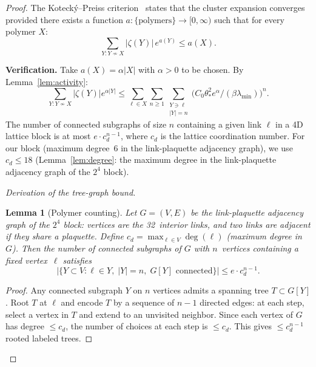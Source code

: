 \documentclass[11pt]{article}
\newtheorem{lemma}[theorem]{Lemma}
\theoremstyle{definition}
\begin{document}
\begin{proof}
The Koteck\'y--Preiss criterion~\cite{KP} states that the cluster
expansion converges provided there exists a function
$a:\{\text{polymers}\}\to[0,\infty)$ such that for every polymer $X$:
\begin{equation}\label{eq:KP}
\sum_{Y:Y\not\sim X}|\zeta(Y)|\,e^{a(Y)}\le a(X).
\end{equation}

\textbf{Verification.}
Take $a(X)=\alpha|X|$ with $\alpha>0$ to be chosen.
By Lemma~\ref{lem:activity}:
\begin{equation}
\sum_{Y:Y\not\sim X}|\zeta(Y)|e^{\alpha|Y|}
\le\sum_{\ell\in X}\sum_{n\ge 1}\sum_{\substack{Y\ni\ell\\|Y|=n}}
\bigl(C_0\theta_*^2 e^\alpha/(\beta\lambda_{\min})\bigr)^n.
\end{equation}
The number of connected subgraphs of size $n$ containing a given
link $\ell$ in a 4D lattice block is at most $e\cdot c_d^{n-1}$,
where $c_d$ is the lattice coordination number.  For our block
(maximum degree~6 in the link-plaquette adjacency graph), we use
$c_d\le 18$ (Lemma~\ref{lem:degree}: the maximum degree
in the link-plaquette adjacency graph of the $2^4$ block).

\emph{Derivation of the tree-graph bound.}

\begin{lemma}[Polymer counting]\label{lem:polymer-count}
Let $G=(V,E)$ be the link-plaquette adjacency graph of the
$2^4$ block: vertices are the 32~interior links, and two
links are adjacent if they share a plaquette.  Define
$c_d=\max_{\ell\in V}\deg(\ell)$ (maximum degree in $G$).
Then the number of connected subgraphs of $G$ with
$n$~vertices containing a fixed vertex~$\ell$ satisfies
\begin{equation}\label{eq:polymer-count}
|\{Y\subset V: \ell\in Y,\;|Y|=n,\;
G[Y]\text{ connected}\}|
\le e\cdot c_d^{n-1}.
\end{equation}
\end{lemma}

\begin{proof}
Any connected subgraph $Y$ on $n$ vertices admits a spanning
tree $T\subset G[Y]$.  Root $T$ at $\ell$ and encode $T$ by a
sequence of $n-1$ directed edges: at each step, select a
vertex in $T$ and extend to an unvisited neighbor.  Since each
vertex of $G$ has degree $\le c_d$, the number of choices at
each step is $\le c_d$.  This gives $\le c_d^{n-1}$ rooted
labeled trees.


\end{proof}
\end{proof}
\end{document}
